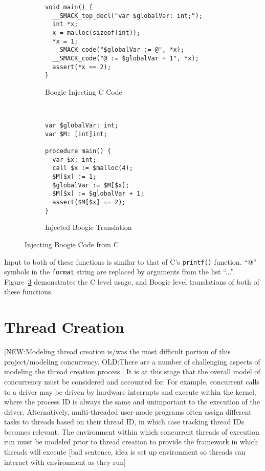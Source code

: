 \begin{figure}[h]
\centering
\begin{subfigure}[b]{1\textwidth}
\centering
\begin{lstlisting}
void main() {
  __SMACK_top_decl("var $globalVar: int;");
  int *x;
  x = malloc(sizeof(int));
  *x = 1;
  __SMACK_code("$globalVar := @", *x);
  __SMACK_code("@ := $globalVar + 1", *x);
  assert(*x == 2);
}
\end{lstlisting}
\caption{Boogie Injecting C Code}\label{fig:cinjToBoogie_a}
\end{subfigure}
~
\begin{subfigure}[b]{1\textwidth}
\centering
\begin{lstlisting}[language=boogie]
var $globalVar: int;
var $M: [int]int;

procedure main() {
  var $x: int;
  call $x := $malloc(4);
  $M[$x] := 1;
  $globalVar := $M[$x];
  $M[$x] := $globalVar + 1;
  assert($M[$x] == 2);
}
\end{lstlisting}
\caption{Injected Boogie Translation}\label{fig:cinjToBoogie_b}
\end{subfigure}
\caption{Injecting Boogie Code from C}\label{fig:cinjToBoogie}
\end{figure}

Input to both of these functions is similar to that of C's
\lstinline|printf()| function.  ``@'' symbols in the
\lstinline|format| string are replaced by arguments from the list
``...''.  Figure~\ref{fig:cinjToBoogie} demonstrates the C level usage,
and Boogie level translations of both of these functions.

\section{Thread Creation}
[NEW:Modeling thread creation is/was the most difficult portion of
this project/modeling concurrency.  OLD:There are a number of
challenging aspects of modeling the thread creation process.]  It is
at this stage that the overall model of 
concurrency must be considered and accounted for.  For example,
concurrent calls to a driver may be driven by hardware interrupts and
execute within the kernel, where the process ID is always the same and
unimportant to the execution of the driver.  Alternatively,
multi-threaded user-mode programs often assign different tasks to
threads based on their thread ID, in which case tracking thread IDs
becomes relevant.  The environment within which concurrent threads of
execution run must be modeled prior to thread creation to provide the
framework in which threads will execute [bad sentence, idea is set up
environment so threads can interact with environment as they run] 


